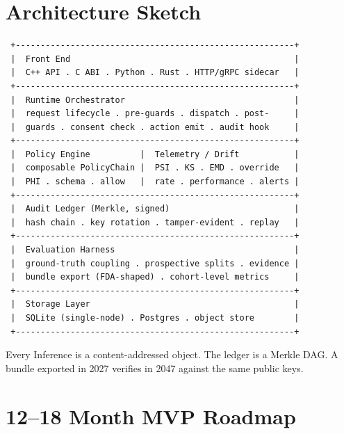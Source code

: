 \documentclass[11pt,a4paper]{article}
\begin{document}
\section{Architecture Sketch}

\begin{verbatim}
 +--------------------------------------------------------+
 |  Front End                                             |
 |  C++ API . C ABI . Python . Rust . HTTP/gRPC sidecar   |
 +--------------------------------------------------------+
 |  Runtime Orchestrator                                  |
 |  request lifecycle . pre-guards . dispatch . post-     |
 |  guards . consent check . action emit . audit hook     |
 +--------------------------------------------------------+
 |  Policy Engine          |  Telemetry / Drift           |
 |  composable PolicyChain |  PSI . KS . EMD . override   |
 |  PHI . schema . allow   |  rate . performance . alerts |
 +--------------------------------------------------------+
 |  Audit Ledger (Merkle, signed)                         |
 |  hash chain . key rotation . tamper-evident . replay   |
 +--------------------------------------------------------+
 |  Evaluation Harness                                    |
 |  ground-truth coupling . prospective splits . evidence |
 |  bundle export (FDA-shaped) . cohort-level metrics     |
 +--------------------------------------------------------+
 |  Storage Layer                                         |
 |  SQLite (single-node) . Postgres . object store        |
 +--------------------------------------------------------+
\end{verbatim}

Every Inference is a content-addressed object. The ledger is a Merkle DAG. A bundle exported in 2027 verifies in 2047 against the same public keys.

\section{12--18 Month MVP Roadmap}
\end{document}
